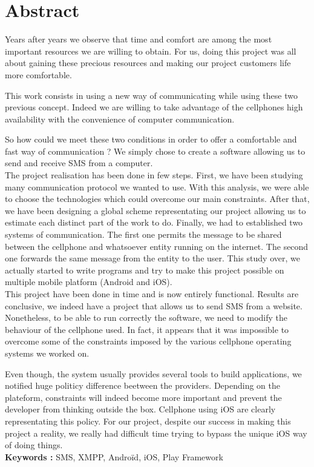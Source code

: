 \cleardoublepage



\chapter*{Abstract}

\thispagestyle{empty}



Years after years we observe that time and comfort are among the most important resources
we are willing to obtain. For us, doing this project was all about gaining these precious
resources and making our project customers life more comfortable.

This work consists in using a new way of communicating while using these two previous concept. 
Indeed we are willing to take advantage of the cellphones high availability with the convenience 
of computer communication.

So how could we meet these two conditions in order to offer a comfortable and fast way of communication ?
We simply chose to create a software allowing us to send and receive SMS from a computer.
\\


The project realisation has been done in few steps. First, we have been studying many communication protocol
we wanted to use. With this analysis, we were able to choose the technologies which could overcome our main constraints.
After that, we have been designing a global scheme representating our project allowing us to estimate
each distinct part of the work to  do. Finally, we had to established two systems of communication.
The first one permits the message to be shared between the cellphone and whatsoever entity running
on the internet. The second one forwards the same message from the entity to the user. This study
over, we actually started to write programs and try to make this project possible on multiple
mobile platform (Android and iOS).
\\


This project have been done in time and is now entirely functional. Results are conclusive,
we indeed have a project that allows us to send SMS from a website. Nonetheless, to be able 
to run correctly the software, we need to modify the behaviour of the cellphone used. In fact,
it appears that it was impossible to overcome some of the constraints imposed by the various
cellphone operating systems we worked on. 

Even though, the system usually provides several tools to build applications, we notified huge
politicy difference beetween the providers. Depending on the plateform, constraints will indeed
become more important and prevent the developer from thinking outside the box.
Cellphone using iOS are clearly representating this policy. For our project, despite our success in
making this project a reality, we really had difficult time trying to bypass the unique iOS way of doing things.
\\



\textbf{Keywords : }
SMS, XMPP, Androïd, iOS, Play Framework
